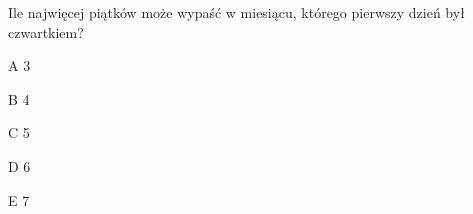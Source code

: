 \begin{tresc}
Ile najwięcej piątków może wypaść w miesiącu, którego pierwszy dzień był czwartkiem?
\end{tresc}
\begin{wariant}{A} 3 \end{wariant}
\begin{wariant}{B} 4 \end{wariant}
\begin{wariant}{C} 5 \end{wariant}
\begin{wariant}{D} 6 \end{wariant}
\begin{wariant}{E} 7 \end{wariant}
